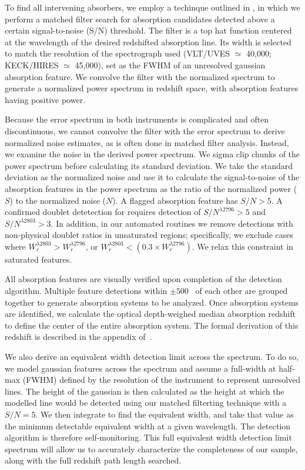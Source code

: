 \documentclass[iop,apj,numberedappendix,appendixfloats,twocolappendix]{emulateapj}
\begin{document}
To find all intervening {\MgIIdblt} absorbers, we employ a techinque outlined in \cite{Zhu2013}, in which we perform a matched filter search for absorption candidates detected above a certain signal-to-noise (S/N) threshold. The filter is a top hat function centered at the wavelength of the desired redshifted absorption line. Its width is selected to match the resolution of the spectrograph used (VLT/UVES $\simeq$ 40,000; KECK/HIRES $\simeq$ 45,000), set as the FWHM of an unresolved gaussian absorption feature. We convolve the filter with the normalized spectrum to generate a normalized power spectrum in redshift space, with absorption features having positive power. 

Because the error spectrum in both instruments is complicated and often discontinuous, we cannot convolve the filter with the error spectrum to derive normalized noise estimates, as is often done in matched filter analysis. Instead, we examine the noise in the derived power spectrum. We sigma clip chunks of the power spectrum before calculating its standard deviation. We take the standard deviation as the normalized noise and use it to calculate the signal-to-noise of the absorption features in the power spectrum as the ratio of the normalized power ($S$) to the normalized noise ($N$). A flagged absorption feature has $S/N > 5$. A confirmed doublet detetection for {\MgIIdblt} requires detection of $S/N^{\lambda2796} > 5$ and $S/N^{\lambda2803} > 3$. In addition, in our automated routines we remove detections with non-physical doublet ratios in unsaturated regions; specifically, we exclude cases where $W_r^{\lambda2803} > W_r^{\lambda2796}$, or $W_r^{\lambda2803} < \left(0.3 \times W_r^{\lambda2796}\right)$. We relax this constraint in saturated features. 

All absorption features are visually verified upon completion of the detection algorithm. Multiple feature detections within $\pm 500$~{\kms} of each other are grouped together to generate absorption systems to be analyzed. Once absorption systems are identified, we calculate the optical depth-weighed median absorption redshift to define the center of the entire absorption system. The formal derivation of this redshift is described in the appendix of~\cite{Churchill2001}.

We also derive an equivalent width detection limit across the spectrum. To do so, we model gaussian features across the spectrum and assume a full-width at half-max (FWHM) defined by the resolution of the instrument to represent unresolved lines. The height of the gaussian is then calculated as the height at which the modelled line would be detected using our matched filterting technique with a $S/N = 5$. We then integrate to find the equivalent width, and take that value as the minimum detectable equivalent width at a given wavelength. The detection algorithm is therefore self-monitoring. This full equivalent width detection limit spectrum will allow us to accurately characterize the completeness of our sample, along with the full redshift path length searched. 
\end{document}
